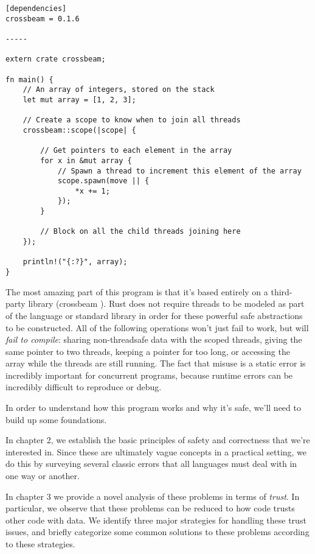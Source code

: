 \begin{verbatim}
[dependencies]
crossbeam = 0.1.6

-----

extern crate crossbeam;

fn main() {
    // An array of integers, stored on the stack
    let mut array = [1, 2, 3];

    // Create a scope to know when to join all threads
    crossbeam::scope(|scope| {

        // Get pointers to each element in the array
        for x in &mut array {
            // Spawn a thread to increment this element of the array
            scope.spawn(move || {
                *x += 1;
            });
        }

        // Block on all the child threads joining here
    });

    println!("{:?}", array);
}
\end{verbatim}

The most amazing part of this program is that it's based entirely on a third-
party library (crossbeam \cite{crossbeam}). Rust does not require threads to be modeled as part
of the language or standard library in order for these powerful safe
abstractions to be constructed. All of the following operations won't just fail
to work, but will \emph{fail to compile}: sharing non-threadsafe data with
the scoped threads, giving the same pointer to two threads, keeping a pointer for too
long, or accessing the array while the threads are still running. The fact that
misuse is a static error is incredibly important for concurrent programs, because
runtime errors can be incredibly difficult to reproduce or debug.

In order to understand how this program works and why it's safe, we'll need to
build up some foundations.

In chapter 2, we establish the basic principles of
safety and correctness that we're interested in. Since these are ultimately
vague concepts in a practical setting, we do this by surveying several classic
errors that all languages must deal with in one way or another.

In chapter 3 we provide a novel analysis of these problems in terms of \emph{trust}.
In particular, we observe that these problems can be reduced to how code trusts
other code with data. We identify three major strategies for handling
these trust issues, and briefly categorize some common solutions to these problems
according to these strategies.

